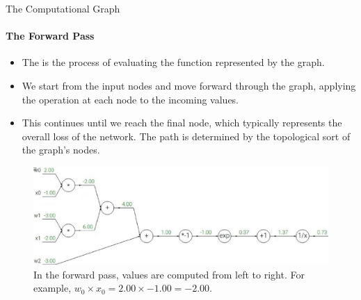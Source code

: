 \begin{frame}{The Computational Graph}
    \framesubtitle{The Forward Pass}
    \begin{itemize}
        \item The  is the process of evaluating the function represented by the graph.
        \item We start from the input nodes and move forward through the graph, applying the operation at each node to the incoming values.
        \item This continues until we reach the final node, which typically represents the overall loss of the network. The path is determined by the topological sort of the graph's nodes.
    \end{itemize}
    \begin{center}
        \begin{minipage}{0.8\textwidth}
        \begin{figure}
            \centering
            \includegraphics[width=\linewidth]{images/computational_graph_sigmoid_forward.png}
            \caption{In the forward pass, values are computed from left to right. For example, $w_0 \times x_0 = 2.00 \times -1.00 = -2.00$.}
        \end{figure}
        \end{minipage}
    \end{center}
\end{frame}

